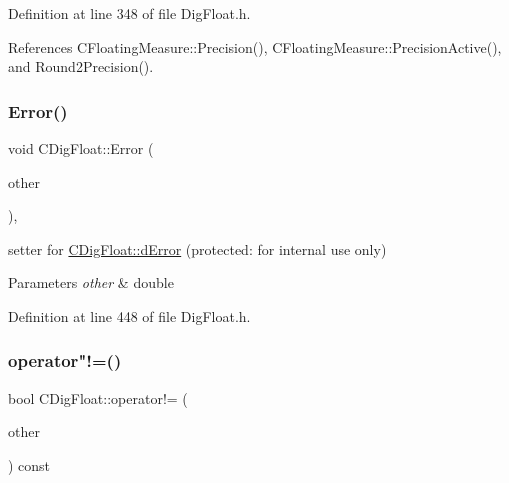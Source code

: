 Definition at line 348 of file Dig\+Float.\+h.



References C\+Floating\+Measure\+::\+Precision(), C\+Floating\+Measure\+::\+Precision\+Active(), and Round2\+Precision().

\mbox{\label{classCDigFloat_a5fdd0d560073f5d06b41c7f66933635e}} 
\subsubsection{\texorpdfstring{Error()}{Error()}\hspace{0.1cm}{\footnotesize\ttfamily [2/2]}}
{\footnotesize\ttfamily void C\+Dig\+Float\+::\+Error (\begin{DoxyParamCaption}\item[{const double}]{other }\end{DoxyParamCaption})\hspace{0.3cm}{\ttfamily [inline]}, {\ttfamily [protected]}}



setter for \hyperlink{classCDigFloat_a25eb3782d1e727ff007a48f8308e3d4d}{C\+Dig\+Float\+::d\+Error} (protected\+: for internal use only) 


\begin{DoxyParams}{Parameters}
{\em other} & double \\
\hline
\end{DoxyParams}


Definition at line 448 of file Dig\+Float.\+h.

\mbox{\label{classCDigFloat_a15c13c035aff8184491bd9629403a33a}} 
\subsubsection{\texorpdfstring{operator"!=()}{operator!=()}}
{\footnotesize\ttfamily bool C\+Dig\+Float\+::operator!= (\begin{DoxyParamCaption}\item[{const \hyperlink{classCDigFloat}{C\+Dig\+Float} \&}]{other }\end{DoxyParamCaption}) const}



